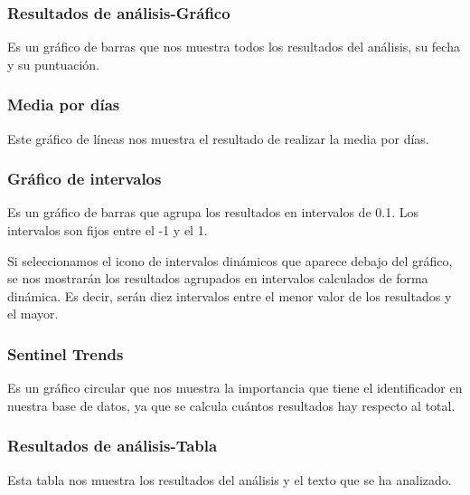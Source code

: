 \subsubsection{Resultados de análisis-Gráfico}
Es un gráfico de barras que nos muestra todos los resultados del análisis, su fecha y su puntuación.


\subsubsection{Media por días}
Este gráfico de líneas nos muestra el resultado de realizar la media por días.


\subsubsection{Gráfico de intervalos}
Es un gráfico de barras que agrupa los resultados en intervalos de 0.1. Los intervalos son fijos entre el -1 y el 1.


Si seleccionamos el icono de intervalos dinámicos que aparece debajo del gráfico, se nos mostrarán los resultados agrupados en intervalos calculados de forma dinámica. Es decir, serán diez intervalos entre el menor valor de los resultados y el mayor.


\subsubsection{Sentinel Trends}

Es un gráfico circular que nos muestra la importancia que tiene el identificador en nuestra base de datos, ya que se calcula cuántos resultados hay respecto al total.


\subsubsection{Resultados de análisis-Tabla}
Esta tabla nos muestra los resultados del análisis y el texto que se ha analizado.

